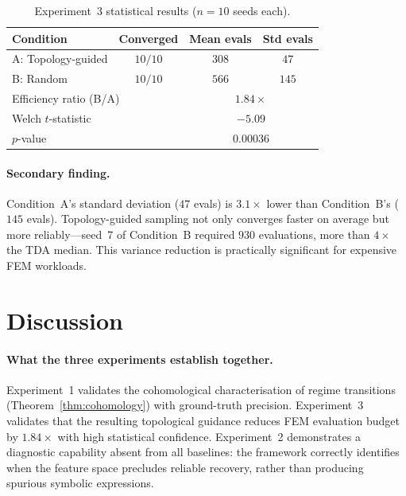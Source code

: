 \documentclass[twoside,11pt]{article}
\begin{document}
\begin{table}[h]
\centering
\caption{Experiment~3 statistical results ($n = 10$ seeds each).}
\label{tab:exp3}
\begin{tabular}{lccc}
\toprule
Condition & Converged & Mean evals & Std evals \\
\midrule
A: Topology-guided & $10/10$ & $308$ & $47$ \\
B: Random          & $10/10$ & $566$ & $145$ \\
\midrule
\multicolumn{2}{l}{Efficiency ratio (B/A)} & \multicolumn{2}{c}{$\mathbf{1.84}\times$} \\
\multicolumn{2}{l}{Welch $t$-statistic}    & \multicolumn{2}{c}{$-5.09$} \\
\multicolumn{2}{l}{$p$-value}              & \multicolumn{2}{c}{$\mathbf{0.00036}$} \\
\bottomrule
\end{tabular}
\end{table}

\paragraph{Secondary finding.}
Condition~A's standard deviation ($47$ evals) is $3.1\times$ lower
than Condition~B's ($145$ evals). Topology-guided sampling not only
converges faster on average but more reliably---seed~7 of Condition~B
required $930$ evaluations, more than $4\times$ the TDA median. This
variance reduction is practically significant for expensive FEM
workloads.

\section{Discussion}
\label{sec:discussion}

\paragraph{What the three experiments establish together.}
Experiment~1 validates the cohomological characterisation of regime
transitions (Theorem~\ref{thm:cohomology}) with ground-truth
precision. Experiment~3 validates that the resulting topological
guidance reduces FEM evaluation budget by $1.84\times$ with high
statistical confidence. Experiment~2 demonstrates a diagnostic
capability absent from all baselines: the framework correctly
identifies when the feature space precludes reliable recovery, rather
than producing spurious symbolic expressions.
\end{document}

